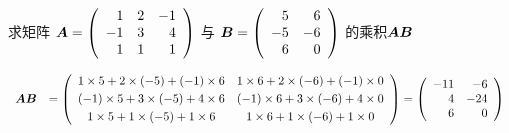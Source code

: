 \begin{li}
  求矩阵
  $
  \boldsymbol{A} = \left(
    \begin{array}{rrrr}
      1&2&-1\\
      -1&3&4\\
      1&1&1
    \end{array}
  \right)
  $
  与
  $
  \boldsymbol{B} = \left(
    \begin{array}{rrrr}
      5&6\\
      -5&-6\\
      6&0
    \end{array}
  \right)
  $
  的乘积$\boldsymbol{A}\boldsymbol{B}$
\end{li}
\begin{jie}
  $$
  \begin{array}{cl}
    \boldsymbol{A}\boldsymbol{B} & = \left(
           \begin{array}{ccc}
             1\times5 + 2\times(-5) + (-1)\times6 &
                                                    1\times6 + 2\times(-6) + (-1)\times0 \\[0.1cm]
             (-1)\times5 + 3\times(-5) +    4\times6 &
                                                       (-1)\times6 + 3\times(-6) +    4\times0 \\[0.1cm]
             1\times5 + 1\times(-5) +    1\times6 &
                                                    1\times6 + 1\times(-6) +    1\times0 
           \end{array}
                                                    \right)  =\left(
                                                    \begin{array}{rr}
                                                      -11 & -6\\
                                                      4 & -24\\
                                                      6 & 0
                                                    \end{array}
                                                          \right)   
  \end{array}
  $$
\end{jie}

